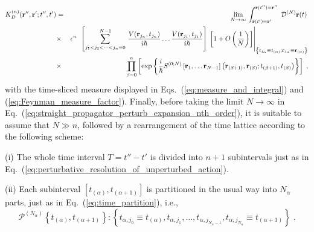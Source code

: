 \documentclass[a4paper,preprint,draft,showpacs,amsmath,amsfonts,amssymb,aps,prd]{revtex4}%
\begin{document}
\begin{eqnarray}
K^{(n)}_{D}({\bf r}'', {\bf r}' ; t'',t')
&
=
& 
\lim_{N \rightarrow \infty}
\,
\int_{  {\bf r} (t')  = {\bf r}'  }^{  {\bf r} (t'')  = {\bf r}'' }
 \;  
{\cal D} ^{(N)} {\bf r} (t) 
\,
\nonumber \\
& \times &
\epsilon^{n}
\;
\left.
\left[
\sum^{N-1}_{ %
          j_{1} < j_{2} <  \dots  < j_{n} =0 }
\,
\frac{ V( {\bf r}_{j_{n}}, t_{j_{n}} ) }{i \hbar}
\ldots
\frac{ V( {\bf r}_{j_{1}}, t_{j_{1}} ) }{i \hbar}
\right]
\,
\left[ 1 + O \left( \frac{1}{N} \right) \right]
\right|_{ \left\{
t_{j_{\alpha}}
 \equiv 
t_{(\alpha)}
;
{\bf r}_{j_{\alpha}} 
 \equiv 
{\bf r}_{(\alpha)}
\right\}
}
\nonumber \\
& \times  &
\prod_{\beta=0}^{n}
\left[
 \exp \left\{ \frac{i}{\hbar} 
S^{(0;N)}   
 \left[ 
{\bf r}_{1},
\dots
{\bf r}_{N-1}
\right]  
\left( {\bf r}_{(\beta+1)}, {\bf r}_{(\beta)} ; t_{(\beta+1)},t_{(\beta)}  \right)  
 \right\}
\right]
\; ,
\label{eq:straight_propagator_perturb_expansion_nth_order}
\end{eqnarray}
with the time-sliced measure
displayed in Eqs.~(\ref{eq:measure_and_integral})
and (\ref{eq:Feynman_measure_factor}).
Finally, before taking the limit $N \rightarrow \infty$
in Eq.~(\ref{eq:straight_propagator_perturb_expansion_nth_order}),
it is suitable to assume that $N \gg n$, followed by a rearrangement
of the time lattice according to the following
scheme:

(i) 
The whole time interval $T=t''-t'$ is divided into $n+1$ subintervals
just as in Eq.~(\ref{eq:perturbative_resolution_of_unperturbed_action}).

(ii)
Each subinterval $[t_{(\alpha)},t_{(\alpha+1)}]$ is
partitioned in the usual way into $N_{\alpha}$ parts,
just as in Eq.~(\ref{eq:time_partition}), i.e.,
\begin{equation}
{\mathcal P}^{(N_{ \alpha}) } 
\left\{
t_{(\alpha)},t_{(\alpha+1)}
\right\}
:
\left\{
t_{\alpha,j_{0}}
 \equiv t_{(\alpha)},
t_{\alpha,j_{1}},
\ldots
,
t_{\alpha,j_{N_{\alpha}-1} },
t_{\alpha,j_{N_{\alpha}} }
 \equiv t_{(\alpha+1)}
\right\}
\;  .
\label{eq:time_subinterval_partition}
\end{equation}
\end{document}
